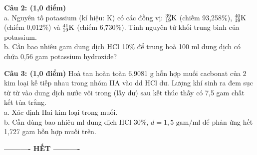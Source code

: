 \documentclass[11pt,a4paper]{article}
\begin{document}
\vspace{1pt}
\noindent
{}

\vspace{4pt}
\noindent
\textbf{Câu 2: (1,0 điểm)}\\
a. Nguyên tố potassium (kí hiệu: K) có các đồng vị: $^{39}_{19}\ce{K}$ (chiếm 93,258\%), $^{40}_{19}\ce{K}$ (chiếm 0,012\%) và $^{41}_{19}\ce{K}$ (chiếm 6,730\%). Tính nguyên tử khối trung bình của potassium.\\
b. Cần bao nhiêu gam dung dịch $\ce{HCl}$ 10\% để trung hoà 100 ml dung dịch có chứa 0,56 gam potassium hydroxide?

\vspace{1pt}
\noindent
{}

\vspace{4pt}
\noindent
\textbf{Câu 3: (1,0 điểm)} Hoà tan hoàn toàn 6,9081 g hỗn hợp muối cacbonat của 2 kim loại kế tiếp nhau trong nhóm IIA vào dd HCl dư. Lượng khí sinh ra đem sục từ từ vào dung dịch nước vôi trong (lấy dư) sau kết thúc thấy có 7,5 gam chất kết tủa trắng.\\
a. Xác định Hai kim loại trong muối.\\
b. Cần dùng bao nhiêu ml dung dịch HCl 30\%, $d = 1,5\text{ gam/ml}$ để phản ứng hết 1,727 gam hỗn hợp muối trên.

\vspace{1pt}
\noindent
{}

\vspace{6pt}
\begin{center}
\textbf{\large ---------- HẾT ----------}
\end{center}
\end{document}
